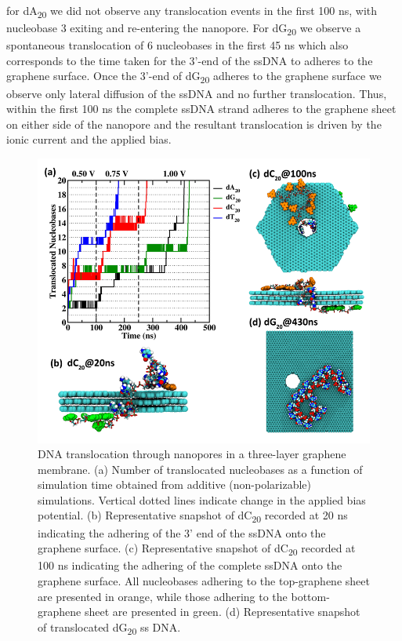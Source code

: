 for dA\textsubscript{20} we did not observe any translocation events in the first 100 ns, with nucleobase 3 exiting and re-entering the nanopore. For dG\textsubscript{20} we observe a spontaneous translocation of 6 nucleobases in the first 45 ns which also corresponds to the time taken for the 3’-end of the ssDNA to adheres to the graphene surface. Once the 3’-end of dG\textsubscript{20} adheres to the graphene surface we observe only lateral diffusion of the ssDNA and no further translocation. Thus, within the first 100 ns the complete ssDNA strand adheres to the graphene sheet on either side of the nanopore and the resultant translocation is driven by the ionic current and the applied bias.
\begin{figure}
    \centering
    \includegraphics[width=\textwidth]{Chapter4/Figures/Figure3.png}
    \caption[DNA translocation through nanopores in a three-layer graphene membrane in additive FF]{DNA translocation through nanopores in a three-layer graphene membrane. (a) Number of translocated nucleobases as a function of simulation time obtained from additive (non-polarizable) simulations. Vertical dotted lines indicate change in the applied bias potential. (b) Representative snapshot of dC\textsubscript{20} recorded at 20 ns indicating the adhering of the 3’ end of the ssDNA onto the graphene surface. (c) Representative snapshot of dC\textsubscript{20} recorded at 100 ns indicating the adhering of the complete ssDNA onto the graphene surface. All nucleobases adhering to the top-graphene sheet are presented in orange, while those adhering to the bottom-graphene sheet are presented in green. (d) Representative snapshot of translocated dG\textsubscript{20} ss DNA.}
\end{figure}

